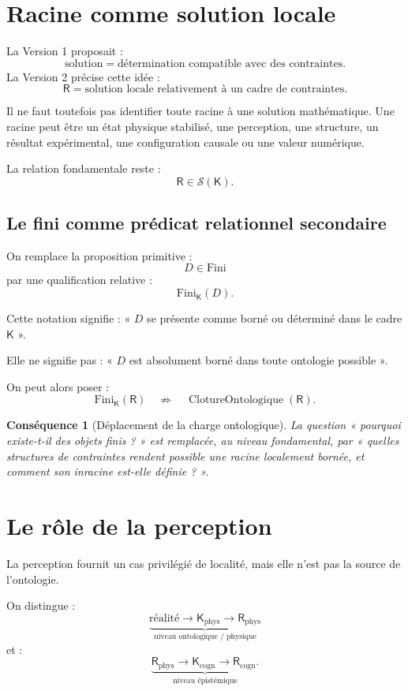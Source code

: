 \documentclass[11pt,a4paper]{article}
\newtheorem{consequence}{Conséquence}[section]
\newcommand{\Rac}{\mathsf{R}}
\newcommand{\Cadre}{\mathsf{K}}
\newcommand{\Sol}{\mathcal{S}}
\newcommand{\ClotureOnt}{\operatorname{ClotureOntologique}}
\begin{document}
\section{Racine comme solution locale}

La Version 1 proposait :
\[
\text{solution}=\text{détermination compatible avec des contraintes}.
\]
La Version 2 précise cette idée :
\[
\boxed{
\Rac=\text{solution locale relativement à un cadre de contraintes}.
}
\]

Il ne faut toutefois pas identifier toute racine à une solution mathématique.
Une racine peut être un état physique stabilisé, une perception, une structure,
un résultat expérimental, une configuration causale ou une valeur numérique.

La relation fondamentale reste :
\[
\Rac\in\Sol(\Cadre).
\]

\subsection{Le fini comme prédicat relationnel secondaire}

On remplace la proposition primitive :
\[
D\in\mathrm{Fini}
\]
par une qualification relative :
\[
\boxed{\mathrm{Fini}_{\Cadre}(D)}.
\]

Cette notation signifie : « \(D\) se présente comme borné ou déterminé dans le
cadre \(\Cadre\) ».

Elle ne signifie pas : « \(D\) est absolument borné dans toute ontologie
possible ».

On peut alors poser :
\[
\boxed{
\mathrm{Fini}_{\Cadre}(\Rac)
\quad\not\Rightarrow\quad
\ClotureOnt(\Rac).
}
\]

\begin{consequence}[Déplacement de la charge ontologique]
La question « pourquoi existe-t-il des objets finis ? » est remplacée, au niveau
fondamental, par « quelles structures de contraintes rendent possible une
racine localement bornée, et comment son inracine est-elle définie ? ».
\end{consequence}

\section{Le rôle de la perception}

La perception fournit un cas privilégié de localité, mais elle n'est pas la
source de l'ontologie.

On distingue :
\[
\underbrace{
\text{réalité}
\to
\Cadre_{\mathrm{phys}}
\to
\Rac_{\mathrm{phys}}
}_{\text{niveau ontologique / physique}}
\]
et :
\[
\underbrace{
\Rac_{\mathrm{phys}}
\to
\Cadre_{\mathrm{cogn}}
\to
\Rac_{\mathrm{cogn}}.
}_{\text{niveau épistémique}}
\]
\end{document}
